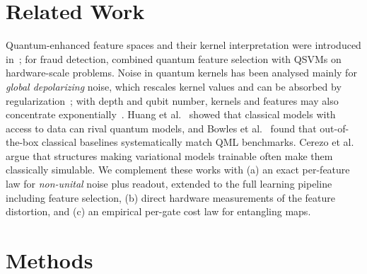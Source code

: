 \documentclass[conference,compsoc]{IEEEtran}
\begin{document}
\section{Related Work}
Quantum-enhanced feature spaces and their kernel interpretation were introduced in~\cite{havlicek2019,schuld2019}; for fraud detection, \cite{grossi2022} combined quantum feature selection with QSVMs on hardware-scale problems. Noise in quantum kernels has been analysed mainly for \emph{global depolarizing} noise, which rescales kernel values and can be absorbed by regularization~\cite{wang2021kernels,heyraud2022}; with depth and qubit number, kernels and features may also concentrate exponentially~\cite{thanasilp2024}. Huang et al.~\cite{huang2021} showed that classical models with access to data can rival quantum models, and Bowles et al.~\cite{bowles2024} found that out-of-the-box classical baselines systematically match QML benchmarks. Cerezo et al.~\cite{cerezo2025} argue that structures making variational models trainable often make them classically simulable. We complement these works with (a) an exact per-feature law for \emph{non-unital} noise plus readout, extended to the full learning pipeline including feature selection, (b) direct hardware measurements of the feature distortion, and (c) an empirical per-gate cost law for entangling maps.

\section{Methods}
\end{document}
